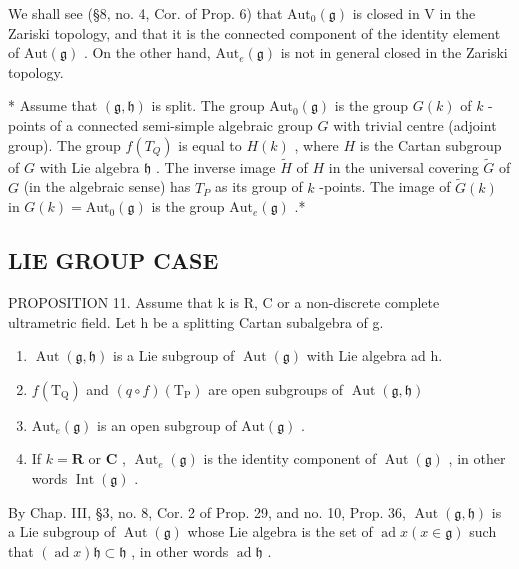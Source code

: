 We shall see (§8, no. 4, Cor. of Prop. 6) that \(\mathrm{Aut}_0(\mathfrak{g})\) is closed in V in the Zariski topology, and that it is the connected component of the identity element of \(\mathrm{Aut}(\mathfrak{g})\) . On the other hand, \(\mathrm{Aut}_e(\mathfrak{g})\) is not in general closed in the Zariski topology.

* Assume that \((\mathfrak{g},\mathfrak{h})\) is split. The group \(\mathrm{Aut}_0(\mathfrak{g})\) is the group \(G(k)\) of \(k\) -points of a connected semi-simple algebraic group \(G\) with trivial centre (adjoint group). The group \(f(T_{Q})\) is equal to \(H(k)\) , where \(H\) is the Cartan subgroup of \(G\) with Lie algebra \(\mathfrak{h}\) . The inverse image \(\tilde{H}\) of \(H\) in the universal covering \(\tilde{G}\) of \(G\) (in the algebraic sense) has \(T_{P}\) as its group of \(k\) -points. The image of \(\tilde{G}(k)\) in \(G(k) = \mathrm{Aut}_0(\mathfrak{g})\) is the group \(\mathrm{Aut}_e(\mathfrak{g})\) .*

\subsection{LIE GROUP CASE}

PROPOSITION 11. Assume that k is R, C or a non-discrete complete ultrametric field. Let h be a splitting Cartan subalgebra of g.

\begin{enumerate}
\def\labelenumi{(\roman{enumi})}
\item
  \(\operatorname{Aut}(\mathfrak{g},\mathfrak{h})\) is a Lie subgroup of \(\operatorname{Aut}(\mathfrak{g})\) with Lie algebra ad h.
\item
  \(f(\mathrm{T}_{\mathrm{Q}})\) and \((q\circ f)(\mathrm{T}_{\mathrm{P}})\) are open subgroups of \(\operatorname {Aut}(\mathfrak{g},\mathfrak{h})\)
\item
  \(\mathrm{Aut}_e(\mathfrak{g})\) is an open subgroup of \(\mathrm{Aut}(\mathfrak{g})\) .
\item
  If \(k = \mathbf{R}\) or \(\mathbf{C}\) , \(\operatorname{Aut}_e(\mathfrak{g})\) is the identity component of \(\operatorname{Aut}(\mathfrak{g})\) , in other words \(\operatorname{Int}(\mathfrak{g})\) .
\end{enumerate}

By Chap. III, §3, no. 8, Cor. 2 of Prop. 29, and no. 10, Prop. 36, \(\operatorname{Aut}(\mathfrak{g}, \mathfrak{h})\) is a Lie subgroup of \(\operatorname{Aut}(\mathfrak{g})\) whose Lie algebra is the set of \(\operatorname{ad} x (x \in \mathfrak{g})\) such that \((\operatorname{ad} x) \mathfrak{h} \subset \mathfrak{h}\) , in other words \(\operatorname{ad} \mathfrak{h}\) .

